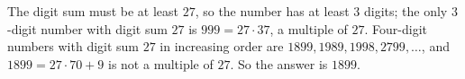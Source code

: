 The digit sum must be at least $27$, so the number has at least $3$ digits; the only $3$-digit number with digit sum $27$ is $999=27\cdot37$, a multiple of $27$. Four-digit numbers with digit sum $27$ in increasing order are $1899,1989,1998,2799,\dots$, and $1899=27\cdot70+9$ is not a multiple of $27$. So the answer is $\boxed{1899}$.
